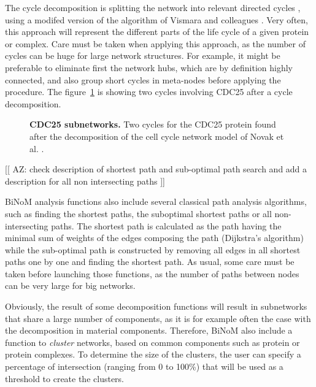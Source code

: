 \documentclass[10pt]{bmc_article}
\newenvironment{bmcformat}{\baselineskip20pt\sloppy\setboolean{publ}{false}}{\baselineskip20pt\sloppy}
\begin{document}
\begin{bmcformat}
The cycle decomposition is splitting the network into relevant directed cycles
\cite{gleiss2001relevant}, using a modifed version of the algorithm of Vismara
and colleagues \cite{vismara1997union}. Very often, this approach will represent
the different parts of the life cycle of a given protein or complex. Care must
be taken when applying this approach, as the number of cycles can be huge for
large network structures. For example, it might be preferable to eliminate first
the network hubs, which are by definition highly connected, and also group short
cycles in meta-nodes before applying the procedure. The figure~\ref{mphasecdc25cycles} is showing two
cycles involving CDC25 after a cycle decomposition.

\begin{figure}[h]
 \caption{\label{mphasecdc25cycles}  \textbf{CDC25 subnetworks.}
      Two cycles for the CDC25 protein found after the decomposition of the cell cycle network model of Novak et al. \cite{novak1998model}.}
\end{figure}


[[ AZ: check description of shortest path and sub-optimal path search and add a description for all non intersecting paths ]]


BiNoM analysis functions also include several classical path analysis
algorithms, such as finding the shortest paths, the suboptimal shortest paths or
all non-intersecting paths. The shortest path is calculated as the path having
the minimal sum of weights of the edges composing the path (Dijkstra's
algorithm) while the sub-optimal path is constructed by removing all edges in
all shortest paths one by one and finding the shortest path. As usual, some care
must be taken before launching those functions, as the number of paths between nodes can be
very large for big networks.

Obviously, the result of some decomposition functions will result in subnetworks
that share a large number of components, as it is for example often the case
with the decomposition in material components. Therefore, BiNoM also include a
function to \emph{cluster} networks, based on common components such as protein
or protein complexes. To determine the size of the clusters, the user can
specify a percentage of intersection (ranging from 0 to 100\%) that will be used
as a threshold to create the clusters.


\end{bmcformat}
\end{document}
